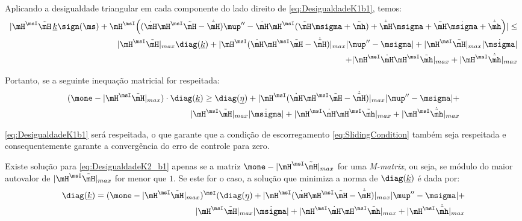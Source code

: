 \documentclass[]{politex}
\begin{document}
\begin{itemize}
\begin{itemize}
Aplicando a desigualdade triangular em cada componente do lado direito de \eqref{eq:DesigualdadeK1b1}, temos:
\begin{equation}
\begin{split}
| \mH^\msI \tilde{\mH} \, \underline{k} \sign(\ms) + \mH^\msI \Big( ( \dot{\mH} \mH^\msI \tilde{\mH} -\dot{\tilde{\mH}}) \mup'' -  \dot{\mH} \mH^\msI ( \tilde{\mH}\msigma + \tilde{\mh} ) +  \dot{\tilde{\mH}}\msigma + \tilde{\mH} \dot{\msigma} + \dot{\tilde{\mh}} \Big) | \leq \\ |
 \mH^\msI \tilde{\mH} |_{max} \diag(\underline{k}) + |\mH^\msI ( \dot{\mH} \mH^\msI \tilde{\mH} -\dot{\tilde{\mH}}) |_{max} | \mup'' - \msigma|  + |\mH^\msI \tilde{\mH}|_{max}| \dot{\msigma}| \\
  + |\mH^\msI \dot{\mH} \mH^\msI  \tilde{\mh}|_{max}+ |\mH^\msI \dot{\tilde{\mh}}|_{max}
\end{split}
\end{equation}

Portanto, se a seguinte inequa\c{c}\~ao matricial for respeitada:
\begin{equation} \label{eq:DesigualdadeK2_b1}
\begin{split}
(\mone - | \mH^\msI \tilde{\mH}|_{max} ) \cdot \diag(\underline{k})  \geq \diag(\underline{\eta}) + |\mH^\msI ( \dot{\mH} \mH^\msI \tilde{\mH} -\dot{\tilde{\mH}}) |_{max} | \mup'' -\msigma|  + \\ |\mH^\msI \tilde{\mH}|_{max}| \dot{\msigma}| + |\mH^\msI \dot{\mH} \mH^\msI  \tilde{\mh}|_{max}+ |\mH^\msI \dot{\tilde{\mh}}|_{max}
\end{split}
\end{equation}

\eqref{eq:DesigualdadeK1b1} ser\'a respeitada, o que garante que a condi\c{c}\~ao de escorregamento \eqref{eq:SlidingCondition} tamb\'em seja respeitada e consequentemente garante a converg\^encia do erro de controle para zero.

Existe solu\c{c}\~ao para \eqref{eq:DesigualdadeK2_b1} apenas se a matriz $\mone - | \mH^\msI \tilde{\mH}|_{max}$ for uma \emph{M-matrix}, ou seja, se módulo do maior autovalor de $| \mH^\msI \tilde{\mH}|_{max}$ for menor que $1$. Se este for o caso, a solução que minimiza a norma de $\diag(\underline{k})$ é dada por:
\begin{equation} \label{eq:MatrizDiagk_b1}
\begin{split}
\diag(\underline{k})  = (\mone - | \mH^\msI \tilde{\mH}|_{max} )^\msI (\diag(\underline{\eta}) + |\mH^\msI ( \dot{\mH} \mH^\msI \tilde{\mH} -\dot{\tilde{\mH}}) |_{max} | \mup'' -\msigma|  + \\ |\mH^\msI \tilde{\mH}|_{max}| \dot{\msigma}| + |\mH^\msI \dot{\mH} \mH^\msI  \tilde{\mh}|_{max}+ |\mH^\msI \dot{\tilde{\mh}}|_{max}
\end{split}
\end{equation}


\end{itemize}
\end{itemize}
\end{document}
